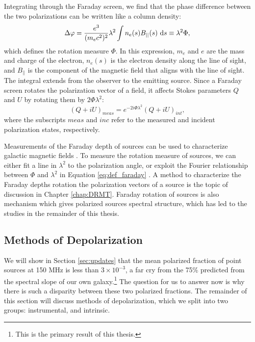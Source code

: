 Integrating through the Faraday screen, we find that the phase difference between the two
polarizations can be written like a column density: 
\begin{equation}
  \Delta\varphi = \frac{e^3}{(m_ec^2)^2}\lambda^2\int n_e(s)B_{||}(s)\ \mathrm{d}s
  \equiv \lambda^2\Phi,
  \label{eq:def_faraday_depth}
\end{equation}
which defines the rotation measure $\Phi$. In this
expression, $m_e$ and $e$ are the mass and charge of the electron, $n_e(s)$ is the electron density
along the line of sight, and $B_{||}$ is the component of the magnetic field that aligns with the
line of sight. The integral extends from the observer to the emitting source. Since a Faraday
screen rotates the polarization vector of a field, it affects Stokes parameters $Q$ and $U$ by
rotating them by $2\Phi\lambda^2$: 
\begin{equation}
  (Q + iU)_{meas} = e^{-2i\Phi\lambda^2}(Q+iU)_{int},
  \label{eq:def_faraday}
\end{equation}
where the subscripts $meas$ and $inc$ refer to the measured and incident polarization states,
respectively. 

Measurements of the Faraday depth of sources can be used to characterize galactic magnetic fields
\cite[][e.g.]{Beck2013}. To measure the rotation measure of sources, we can either fit a line in
$\lambda^2$ to the polarization angle, or exploit the Fourier relationship between $\Phi$ and
$\lambda^2$ in Equation \ref{eq:def_faraday} \cite{BrentjensDeBruyn}. A method to characterize the Faraday depths 
rotation the polarization vectors of a source is the topic of discussion in Chapter \ref{chap:DRMT}.
Faraday rotation of sources is also mechanism which gives polarized sources spectral structure,
which has led to the studies in the remainder of this thesis.

\subsection{Methods of Depolarization}

We will show in Section \ref{sec:updates} that the mean polarized fraction of point sources at 150 MHz is less than
$3\times10^{-3}$, a far cry from the 75\% predicted from the spectral slope of our own
galaxy.\footnote{This is the primary result of this thesis.} The question for us to answer now is why
there is such a disparity between these two polarized fractions. The remainder of this section will
discuss methods of depolarization, which we split into two groups: instrumental, and intrinsic.

